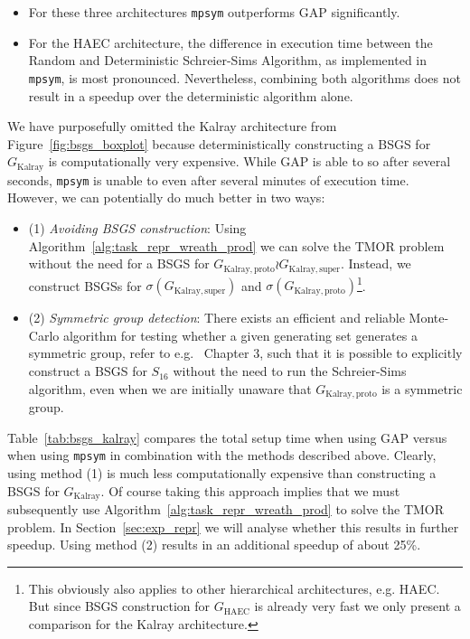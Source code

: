 \begin{itemize}
\item For these three architectures \texttt{mpsym} outperforms GAP significantly.

\item For the HAEC architecture, the difference in execution time between the
Random and Deterministic Schreier-Sims Algorithm, as implemented in
\texttt{mpsym}, is most pronounced.  Nevertheless, combining both algorithms
does not result in a speedup over the deterministic algorithm alone.
\end{itemize}
%
We have purposefully omitted the Kalray architecture from
Figure~\ref{fig:bsgs_boxplot} because deterministically constructing a BSGS for
$G_{\mathrm{Kalray}}$ is computationally very expensive. While GAP is able to
so after several seconds, \texttt{mpsym} is unable to even after several
minutes of execution time. However, we can potentially do much better in two ways:

\begin{itemize}
\item (1) \textit{Avoiding BSGS construction}: Using
Algorithm~\ref{alg:task_repr_wreath_prod} we can solve the TMOR problem without
the need for a BSGS for $G_{\mathrm{Kalray,proto}} \wr
G_{\mathrm{Kalray,super}}$. Instead, we construct BSGSs for
$\sigma(G_{\mathrm{Kalray,super}})$ and
$\sigma(G_{\mathrm{Kalray,proto}})$\footnote{This obviously also applies to
other hierarchical architectures, e.g. HAEC. But since BSGS construction for
$G_{\mathrm{HAEC}}$ is already very fast we only present a comparison for the
Kalray architecture.}.
%
\item (2) \textit{Symmetric group detection}: There exists an efficient and
reliable Monte-Carlo algorithm for testing whether a given generating set
generates a symmetric group, refer to e.g.~\cite{Holt} Chapter 3, such that it
is possible to explicitly construct a BSGS for $S_{16}$ without the need to run
the Schreier-Sims algorithm, even when we are initially unaware that
$G_{\mathrm{Kalray,proto}}$ is a symmetric group.
\end{itemize}

\noindent
Table~\ref{tab:bsgs_kalray} compares the total setup time when using GAP versus
when using \texttt{mpsym} in combination with the methods described above.
Clearly, using method (1) is much less computationally expensive than
constructing a BSGS for $G_{\mathrm{Kalray}}$. Of course taking this approach
implies that we must subsequently use Algorithm~\ref{alg:task_repr_wreath_prod}
to solve the TMOR problem. In Section~\ref{sec:exp_repr} we will analyse
whether this results in further speedup. Using method (2) results in an
additional speedup of about 25\%.

